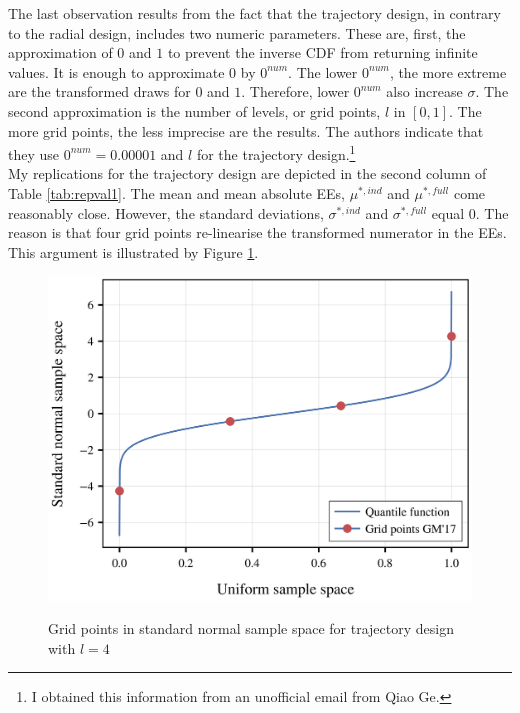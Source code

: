 \documentclass[a4paper,12pt]{article}
\begin{document}
The last observation results from the fact that the trajectory design, in contrary to the radial design, includes two numeric parameters. These are, first, the approximation of $0$ and $1$ to prevent the inverse CDF from returning infinite values. It is enough to approximate $0$ by $0^{num}$. The lower $0^{num}$, the more extreme are the transformed draws for $0$ and $1$. Therefore, lower $0^{num}$ also increase $\sigma$. The second approximation is the number of levels, or grid points, $l$ in $[0,1]$. The more grid points, the less imprecise are the results.
The authors indicate that they use $0^{num}=0.00001$ and $l$ for the trajectory design.\footnote{I obtained this information from an unofficial email from Qiao Ge.}\\

\noindent
My replications for the trajectory design are depicted in the second column of Table \ref{tab:repval1}. The mean and mean absolute EEs, $\mu^{*,ind}$ and $\mu^{*,full}$ come reasonably close. However, the standard deviations, $\sigma^{*,ind}$ and $\sigma^{*,full}$ equal 0. The reason is that four grid points re-linearise the transformed numerator in the EEs. This argument is illustrated by Figure \ref{fig:invcdf}.



\begin{figure}[H]
	\caption{Grid points in standard normal sample space for trajectory design with $l=4$}
	\centering
	\includegraphics[scale=0.40]{../../../scrypy/figures/quantile_fct}
	\label{fig:invcdf}
\end{figure}
\end{document}
